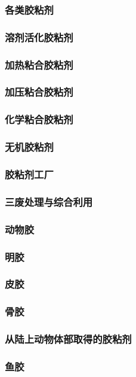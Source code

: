 \documentclass[UTF8]{../../ApplicationUniverse}
\begin{document}
        \subsubsection{各类胶粘剂}
            \subsubsection{溶剂活化胶粘剂}
            \subsubsection{加热粘合胶粘剂}
            \subsubsection{加压粘合胶粘剂}
            \subsubsection{化学粘合胶粘剂}
            \subsubsection{无机胶粘剂}
    \subsubsection{胶粘剂工厂}
    \subsubsection{三废处理与综合利用}
\subsubsection{动物胶}
    \subsubsection{明胶}
    \subsubsection{皮胶}
    \subsubsection{骨胶}
    \subsubsection{从陆上动物体部取得的胶粘剂}
    \subsubsection{鱼胶}
\end{document}
